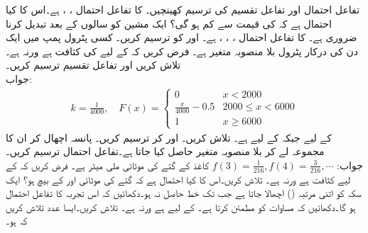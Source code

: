 \quad
تفاعل احتمال  اور تفاعل تقسیم کی ترسیم کھینچیں۔
\quad
{} کا تفاعل احتمال ، ،  ہے۔اس کا کیا احتمال ہے کہ  کی قیمت  سے کم ہو گی؟
\quad
ایک مشین کو  سالوں کے بعد تبدیل کرنا ضروری ہے۔ کا تفاعل احتمال ، ، ،  ہے۔ اور  کو ترسیم کریں۔
\quad
کسی پٹرول پمپ میں ایک دن کی درکار پٹرول بلا منصوبہ متغیر  ہے۔ فرض کریں کہ  کے لیے  کی کثافت  ہے ورنہ  ہے۔ تلاش کریں اور تفاعل تقسیم  ترسیم کریں۔\\
جواب:\quad
\begin{align*}
k=\tfrac{1}{4000},\quad 
F(x)=
\begin{cases}
0&x<2000\\
\tfrac{x}{4000}-0.5&2000\le x<6000\\
1&x\ge 6000
\end{cases}
\end{align*}
\quad
{} کے لیے  جبکہ  کے لیے  ہے۔ تلاش کریں۔  اور  کر ترسیم کریں۔
\quad
{} پانسہ اچھال کر ان کا مجموعہ لے کر بلا منصوبہ متغیر  حاصل کیا جاتا ہے۔تفاعل احتمال  ترسیم کریں۔\\
جواب:\quad
$f(3)=\tfrac{1}{216}, f(4)=\tfrac{3}{216},\cdots$
\quad
کاغذ کے گتے کی موٹائی  ملی میٹر ہے۔ فرض کریں کہ  کے لیے کثافت  ہے ورنہ  ہے۔ تلاش کریں۔اس کا کیا احتمال ہے کہ گتے کی موٹائی  اور  کے بیچ ہو؟
\quad
ایک سکہ کو اتنی مرتبہ ()  اچھالا جاتا ہے جب تک خط حاصل نہ ہو۔دکھائیں کہ اس تجربہ کا تفاعل احتمال  ہو گا۔دکھائیں کہ  مساوات  کو مطمئن کرتا ہے۔
\quad
{} کے لیے  ہے ورنہ  ہے۔ تلاش کریں۔ایسا عدد  تلاش کریں کہ  ہو۔
